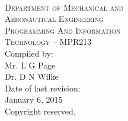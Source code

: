 \begin{titlepage}
    \thispagestyle{empty}
    \begin{center}
        \ \\
        \vspace{1.5cm}
        {\Large
            \textsc{Department of Mechanical and} \\
            \vspace{0.2cm}
            \textsc{Aeronautical Engineering}} \\
        \vspace{1.2cm}
        {\huge
            \textsc{Programming And Information} \\
            \vspace{0.4em}
            \textsc{Technology -- MPR213}} \\
        \vspace{2.0cm}
        {\large Compiled by:} \\
        \vspace{0.2cm}
        {\large Mr. L G Page} \\
        {\large Dr. D N Wilke} \\
        \vspace{1cm}
        {\large Date of last revision:} \\
        \vspace{0.2cm}
        {\large January 6, 2015} \\
        \vspace{1cm}
        {\large Copyright reserved.} \\
    \end{center}
\end{titlepage}

